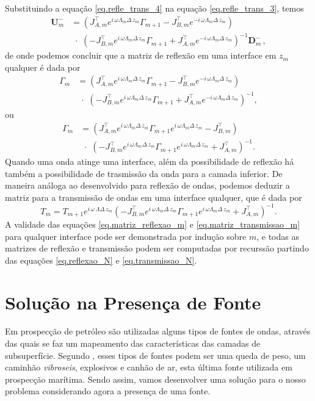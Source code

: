 Substituindo a equa\c{c}\~ao \ref{eq.refle_trans_4} na equa\c{c}\~ao \ref{eq.refle_trans_3}, temos
\begin{align*}
\mathbf{U}_m^-&=(J^\top_{A,m}e^{i\,\omega\Lambda_m\Delta\,z_m}\Gamma_{m+1}-J^\top_{B,m}e^{-i\,\omega\Lambda_m\Delta\,z_m})\\
&\,\,\cdot\,\,(-J^\top_{B,m}e^{i\,\omega\Lambda_m\Delta\,z_m}\Gamma_{m+1}+J^\top_{A,m}e^{-i\,\omega\Lambda_m\Delta\,z_m})^{-1}\mathbf{D}_m^-\,,
\end{align*}
de onde podemos concluir que a matriz de reflex\~ao em uma interface em $z_m$ qualquer \'e dada por
\begin{align*}
\Gamma_{m}&=(J^\top_{A,m}e^{i\,\omega\Lambda_m\Delta\,z_m}\Gamma_{m+1}-J^\top_{B,m}e^{-i\,\omega\Lambda_m\Delta\,z_m})\\
&\,\,\cdot\,\,(-J^\top_{B,m}e^{i\,\omega\Lambda_m\Delta\,z_m}\Gamma_{m+1}+J^\top_{A,m}e^{-i\,\omega\Lambda_m\Delta\,z_m})^{-1},
\end{align*}
ou
\begin{align}\nonumber
\Gamma_{m}&=(J^\top_{A,m}e^{i\,\omega\Lambda_m\Delta\,z_m}\Gamma_{m+1}e^{i\,\omega\Lambda_m\Delta\,z_m}-J^\top_{B,m})\\\label{eq.matriz_reflexao_m}
&\,\,\cdot\,\,(-J^\top_{B,m}e^{i\,\omega\Lambda_m\Delta\,z_m}\Gamma_{m+1}e^{i\,\omega\Lambda_m\Delta\,z_m}+J^\top_{A,m})^{-1}.
\end{align}
Quando uma onda atinge uma interface, al\'em da possibilidade de reflex\~ao h\'a tamb\'em a possibilidade de trasmiss\~ao da onda para a camada inferior. De maneira an\'aloga ao desenvolvido para reflex\~ao de ondas, podemos deduzir a matriz para a transmiss\~ao de ondas em uma interface qualquer, que \'e dada por
\begin{equation}\label{eq.matriz_transmissao_m}
T_m=T_{m+1}e^{i\,\omega\,\Lambda\Delta\,z_m}(-J^\top_{B,m}e^{i\,\omega\Lambda_m\Delta\,z_m}\Gamma_{m+1}e^{i\,\omega\Lambda_m\Delta\,z_m}+J^\top_{A,m})^{-1}.
\end{equation}
A validade das equa\c{c}\~oes \ref{eq.matriz_reflexao_m} e \ref{eq.matriz_transmissao_m} para qualquer interface pode ser demonstrada por indu\c{c}\~ao sobre $m$, e todas as matrizes de reflex\~ao e transmiss\~ao podem ser computadas por recurss\~ao partindo das equa\c{c}\~oes \ref{eq.reflexao_N} e \ref{eq.transmissao_N}.

\section{Solu\c{c}\~ao na Presen\c{c}a de Fonte}\label{sec.presenca_fonte}
Em prospec\c{c}\~ao de petr\'oleo s\~ao utilizadas alguns tipos de fontes de ondas, atrav\'es das quais se faz um mapeamento das caracter\'isticas das camadas de subsuperf\'icie. Segundo \cite{dobrin_88}, esses tipos de fontes podem ser uma queda de peso, um caminh\~ao \textit{vibroseis}, explosivos e canh\~ao de ar, esta \'ultima fonte utilizada em prospec\c{c}\~ao mar\'itima. Sendo assim, vamos desenvolver uma solu\c{c}\~ao para o nosso problema considerando agora a presen\c{c}a de uma fonte.


